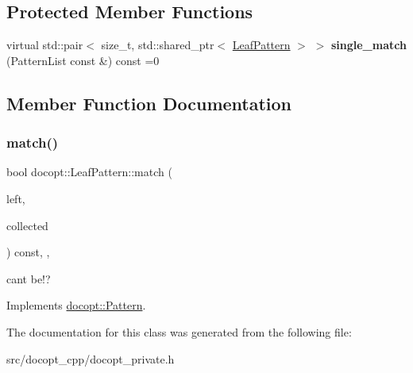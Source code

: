 \subsection*{Protected Member Functions}
\begin{DoxyCompactItemize}
\item 
\mbox{\label{classdocopt_1_1LeafPattern_ae41cbcdb3d0b326ebae660148f860d27}} 
virtual std\+::pair$<$ size\+\_\+t, std\+::shared\+\_\+ptr$<$ \hyperlink{classdocopt_1_1LeafPattern}{Leaf\+Pattern} $>$ $>$ {\bfseries single\+\_\+match} (Pattern\+List const \&) const =0
\end{DoxyCompactItemize}


\subsection{Member Function Documentation}
\mbox{\label{classdocopt_1_1LeafPattern_a634a7028ce2c71ebb89586088034b7e2}} 
\subsubsection{\texorpdfstring{match()}{match()}}
{\footnotesize\ttfamily bool docopt\+::\+Leaf\+Pattern\+::match (\begin{DoxyParamCaption}\item[{Pattern\+List \&}]{left,  }\item[{std\+::vector$<$ std\+::shared\+\_\+ptr$<$ \hyperlink{classdocopt_1_1LeafPattern}{Leaf\+Pattern} $>$$>$ \&}]{collected }\end{DoxyParamCaption}) const\hspace{0.3cm}{\ttfamily [inline]}, {\ttfamily [override]}, {\ttfamily [virtual]}}

cant be!? 

Implements \hyperlink{classdocopt_1_1Pattern}{docopt\+::\+Pattern}.



The documentation for this class was generated from the following file\+:\begin{DoxyCompactItemize}
\item 
src/docopt\+\_\+cpp/docopt\+\_\+private.\+h\end{DoxyCompactItemize}
